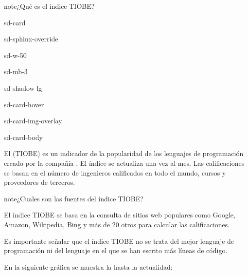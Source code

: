 \documentclass[letterpaper,10pt,spanish]{sphinxmanual}
\begin{document}
\begin{sphinxadmonition}{note}{¿Qué es el índice TIOBE?}

\begin{sphinxuseclass}{sd-card}
\begin{sphinxuseclass}{sd-sphinx-override}
\begin{sphinxuseclass}{sd-w-50}
\begin{sphinxuseclass}{sd-mb-3}
\begin{sphinxuseclass}{sd-shadow-lg}
\begin{sphinxuseclass}{sd-card-hover}
\noindent{}

\begin{sphinxuseclass}{sd-card-img-overlay}
\begin{sphinxuseclass}{sd-card-body}
\end{sphinxuseclass}
\end{sphinxuseclass}
\end{sphinxuseclass}
\end{sphinxuseclass}
\end{sphinxuseclass}
\end{sphinxuseclass}
\end{sphinxuseclass}
\end{sphinxuseclass}
\sphinxAtStartPar
El  (TIOBE) es un indicador de la popularidad de los lenguajes de programación creado por la compañía . El índice se actualiza una vez al mes. Las calificaciones se basan en el número de ingenieros calificados en todo el mundo, cursos y proveedores de terceros.
\end{sphinxadmonition}

\begin{sphinxadmonition}{note}{¿Cuales son las fuentes del índice TIOBE?}

\sphinxAtStartPar
El índice TIOBE se basa en la consulta de sitios web populares como Google, Amazon, Wikipedia, Bing y más de 20 otros para calcular las calificaciones.

\sphinxAtStartPar
Es importante señalar que el índice TIOBE no se trata del mejor lenguaje de programación ni del lenguaje en el que se han escrito más líneas de código.
\end{sphinxadmonition}

\sphinxAtStartPar
En la siguiente gráfica se muestra la  hasta la actualidad:
\end{document}
